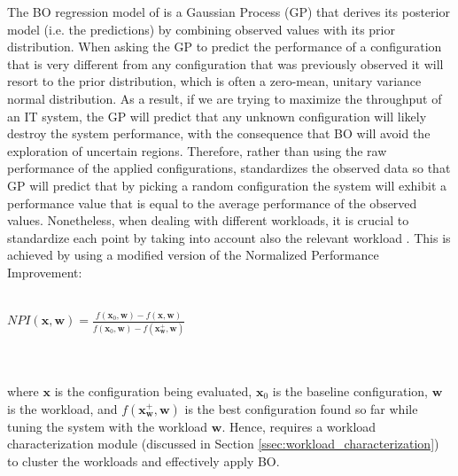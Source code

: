\documentclass[a4paper, 12pt]{article} %
\begin{document}
	The BO regression model of \cite{AkamasCGP} is a Gaussian Process (GP) that derives its posterior model (i.e. the predictions) by combining observed values with its prior distribution. When asking the GP to predict the performance of a configuration that is very different from any configuration that was previously observed it will resort to the prior distribution, which is often a zero-mean, unitary variance normal distribution. As a result, if we are trying to maximize the throughput of an IT system, the GP will predict that any unknown configuration will likely destroy the system performance, with the consequence that BO will avoid the exploration of uncertain regions. Therefore, rather than using the raw performance of the applied configurations, \cite{AkamasCGP} standardizes the observed data so that GP will predict that by picking a random configuration the system will exhibit a performance value that is equal to the average performance of the observed values.
	Nonetheless, when dealing with different workloads, it is crucial to standardize each point by taking into account also the relevant workload \cite{AkamasCGP}. This is achieved by using a modified version of the Normalized Performance Improvement:\\\\
	\centerline{
		$
		NPI(\pmb{x}, \pmb{w}) = \frac{f(\pmb{x}_0, \pmb{w}) - f(\pmb{x}, \pmb{w})}{f(\pmb{x}_0, \pmb{w}) - f(\pmb{x}^+_{\pmb{w}}, \pmb{w})}
		$
	}\\\\
	where $\pmb{x}$ is the configuration being evaluated, $\pmb{x}_0$ is the baseline configuration, $\pmb{w}$ is the workload, and $f(\pmb{x}^+_{\pmb{w}}, \pmb{w})$ is the best configuration found so far while tuning the system with the workload $\pmb{w}$. Hence, \cite{AkamasCGP} requires a workload characterization module (discussed in Section \ref{ssec:workload_characterization}) to cluster the workloads and effectively apply BO.
	
\end{document}
